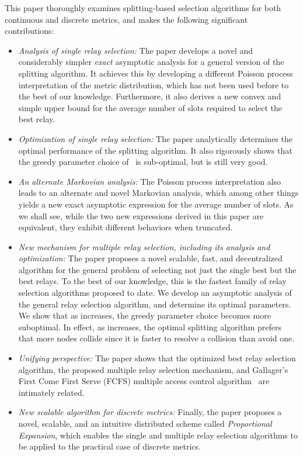 \documentclass[12pt,draftcls,peerreview, onecolumn]{IEEEtran}
\begin{document}
This paper thoroughly examines splitting-based selection algorithms
for both continuous and discrete metrics, and makes the following
significant contributions:
\begin{itemize}
  
\item {\em Analysis of single relay selection:} The paper develops a
  novel and considerably simpler {\em exact} asymptotic analysis for a
  general version of the splitting algorithm.  It achieves this by
  developing a different Poisson process interpretation of the metric
  distribution, which has not been used before to the best of our
  knowledge. Furthermore, it also derives a new convex and simple
  upper bound for the average number of slots required to select the
  best relay.

\item {\em Optimization of single relay selection:} The paper
  analytically determines the optimal performance of the splitting
  algorithm. It also rigorously shows that the greedy parameter choice
  of~\cite{qin_infocomm_2004} is sub-optimal, but is still very good.
  
\item {\em An alternate Markovian analysis:} The Poisson process
  interpretation also leads to an alternate and novel Markovian
  analysis, which among other things yields a new exact asymptotic
  expression for the average number of slots. As we shall see, while
  the two new expressions derived in this paper are equivalent, they
  exhibit different behaviors when truncated.
  
\item {\em New mechanism for multiple relay selection, including its
    analysis and optimization:} The paper proposes a novel scalable,
  fast, and decentralized algorithm for the general problem of
  selecting not just the single best but the best  relays. To
  the best of our knowledge, this is the fastest family of  relay
  selection algorithms proposed to date. We develop an asymptotic
  analysis of the general  relay selection algorithm, and determine
  its optimal parameters. We show that as  increases, the greedy
  parameter choice becomes more suboptimal. In effect, as 
  increases, the optimal splitting algorithm prefers that more nodes
  collide since it is faster to resolve a collision than avoid one.

\item {\em Unifying perspective:} The paper shows that the optimized
  best relay selection algorithm, the proposed multiple relay
  selection mechanism, and Gallager's First Come First Serve (FCFS)
  multiple access control algorithm~\cite{bertsekas_gallager} are intimately
  related.
  
\item {\em New scalable algorithm for discrete metrics:} Finally, the
  paper proposes a novel, scalable, and an intuitive distributed
  scheme called {\em Proportional Expansion}, which enables the single
  and multiple relay selection algorithms to be applied to the
  practical case of discrete metrics.

\end{itemize}
\end{document}

